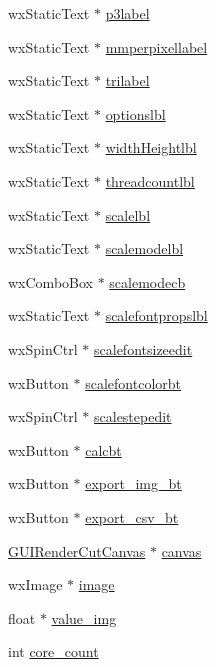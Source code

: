 \begin{DoxyCompactItemize}
\item 
wx\-Static\-Text $\ast$ \hyperlink{classGUICutRenderWindow_a6d1f742f0a78f84882f543f0cbbd6357}{p3label}
\item 
wx\-Static\-Text $\ast$ \hyperlink{classGUICutRenderWindow_ab1f4863c699e72e54e8b3f6d320a5e3a}{mmperpixellabel}
\item 
wx\-Static\-Text $\ast$ \hyperlink{classGUICutRenderWindow_a1d6dae72dbc65725dee34799e7fb7af1}{trilabel}
\item 
wx\-Static\-Text $\ast$ \hyperlink{classGUICutRenderWindow_a3317d0e8526d4a11168e86f673576ee3}{optionslbl}
\item 
wx\-Static\-Text $\ast$ \hyperlink{classGUICutRenderWindow_a26632978654028e6fbfaa6eef704ff06}{width\-Heightlbl}
\item 
wx\-Static\-Text $\ast$ \hyperlink{classGUICutRenderWindow_a2797a52c219092ce3f54ea62ec4b95f3}{threadcountlbl}
\item 
wx\-Static\-Text $\ast$ \hyperlink{classGUICutRenderWindow_a3c1e80a372d6eaacd4f6ca71a788c9fd}{scalelbl}
\item 
wx\-Static\-Text $\ast$ \hyperlink{classGUICutRenderWindow_a2a3f0b64122aff2f336f94fb72b3b8ac}{scalemodelbl}
\item 
wx\-Combo\-Box $\ast$ \hyperlink{classGUICutRenderWindow_af535e1e80e14178ff5c05707261a183d}{scalemodecb}
\item 
wx\-Static\-Text $\ast$ \hyperlink{classGUICutRenderWindow_a1f46a30a61ad94b76a6194758bdb3f95}{scalefontpropslbl}
\item 
wx\-Spin\-Ctrl $\ast$ \hyperlink{classGUICutRenderWindow_a62cb232f5f9747c1fdbc5c1f6ff4b7a4}{scalefontsizeedit}
\item 
wx\-Button $\ast$ \hyperlink{classGUICutRenderWindow_a13a1557216de339d20189fdaa0df482b}{scalefontcolorbt}
\item 
wx\-Spin\-Ctrl $\ast$ \hyperlink{classGUICutRenderWindow_a4fbe9115e418be48a70eff31e94640ba}{scalestepedit}
\item 
wx\-Button $\ast$ \hyperlink{classGUICutRenderWindow_a7cadc8f5fd1b153ba21aa82fd5f70eff}{calcbt}
\item 
wx\-Button $\ast$ \hyperlink{classGUICutRenderWindow_ac0b26b746d6339154256d81da8cd7aed}{export\-\_\-img\-\_\-bt}
\item 
wx\-Button $\ast$ \hyperlink{classGUICutRenderWindow_a1613155eefe8309903858f9427b263de}{export\-\_\-csv\-\_\-bt}
\item 
\hyperlink{classGUIRenderCutCanvas}{G\-U\-I\-Render\-Cut\-Canvas} $\ast$ \hyperlink{classGUICutRenderWindow_abbaa6c66e8aa9fee96ba20a9a29e1a18}{canvas}
\item 
wx\-Image $\ast$ \hyperlink{classGUICutRenderWindow_a30c36db74a83fc5523407d3611c1db34}{image}
\item 
float $\ast$ \hyperlink{classGUICutRenderWindow_a9c8338a733363aea25a8735d6873a414}{value\-\_\-img}
\item 
int \hyperlink{classGUICutRenderWindow_a365103460aeafd2173c0a9360cc0caa1}{core\-\_\-count}
\end{DoxyCompactItemize}


